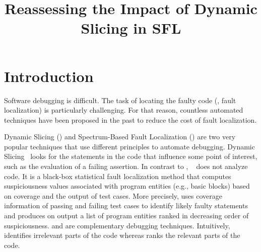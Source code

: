 \documentclass{article}
\title{Reassessing the Impact of Dynamic Slicing in SFL}
\begin{document}
\maketitle

\begin{abstract}
\end{abstract}

\section{Introduction}

Software debugging is difficult. The task of locating the faulty code
(\ie{}, fault localization) is particularly challenging. For that
reason, countless automated techniques have been proposed in the past
to reduce the cost of fault localization.


Dynamic Slicing (\ds{}) and Spectrum-Based Fault Localization (\sfl{})
are two very popular techniques that use different principles to
automate debugging. Dynamic
Slicing~\cite{Agrawal:1990:DPS:93542.93576} looks for the statements
in the code that influence some point of interest, such as the evaluation
of a failing assertion. In contrast to \ds{}, \sfl{}~\cite{7390282}
does not analyze code. It is a black-box statistical fault
localization method that computes suspiciousness values associated
with program entities (e.g., basic blocks) based on coverage and the
output of test cases. More precisely, \sfl{} uses coverage information
of passing and failing test cases to identify likely faulty
statements and produces on output a list of program entities ranked in
decreasing order of suspiciousness.
\ds{} and \sfl{} are complementary debugging techniques. Intuitively, \ds{} identifies
irrelevant parts of the code whereas \sfl{} ranks the relevant parts
of the code.

\end{document}
